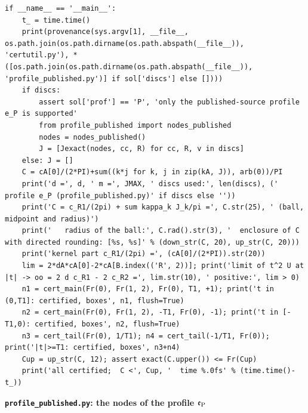 \documentclass[11pt,reqno]{amsart}
\numberwithin{equation}{section}
\theoremstyle{definition}
\theoremstyle{remark}
\newcommand{\appsub}[1]{\par\medskip\noindent\textbf{#1}\par\nobreak\smallskip}
\begin{document}
\begin{lstlisting}
if __name__ == '__main__':
    t_ = time.time()
    print(provenance(sys.argv[1], __file__, os.path.join(os.path.dirname(os.path.abspath(__file__)), 'certutil.py'), *([os.path.join(os.path.dirname(os.path.abspath(__file__)), 'profile_published.py')] if sol['discs'] else [])))
    if discs:
        assert sol['prof'] == 'P', 'only the published-source profile e_P is supported'
        from profile_published import nodes_published
        nodes = nodes_published()
        J = [Jexact(nodes, cc, R) for cc, R, v in discs]
    else: J = []
    C = cA[0]/(2*PI)+sum((k*j for k, j in zip(kA, J)), arb(0))/PI
    print('d =', d, ' m =', JMAX, ' discs used:', len(discs), (' profile e_P (profile_published.py)' if discs else ''))
    print('C = c_R1/(2pi) + sum kappa_k J_k/pi =', C.str(25), ' (ball, midpoint and radius)')
    print('   radius of the ball:', C.rad().str(3), '  enclosure of C with directed rounding: [%s, %s]' % (down_str(C, 20), up_str(C, 20)))
    print('kernel part c_R1/(2pi) =', (cA[0]/(2*PI)).str(20))
    lim = 2*dA*cA[0]-2*cA[B.index(('R', 2))]; print('limit of t^2 U at |t| -> oo = 2 d c_R1 - 2 c_R2 =', lim.str(10), ' positive:', lim > 0)
    n1 = cert_main(Fr(0), Fr(1, 2), Fr(0), T1, +1); print('t in (0,T1]: certified, boxes', n1, flush=True)
    n2 = cert_main(Fr(0), Fr(1, 2), -T1, Fr(0), -1); print('t in [-T1,0): certified, boxes', n2, flush=True)
    n3 = cert_tail(Fr(0), 1/T1); n4 = cert_tail(-1/T1, Fr(0)); print('|t|>=T1: certified, boxes', n3+n4)
    Cup = up_str(C, 12); assert exact(C.upper()) <= Fr(Cup)
    print('all certified;  C <', Cup, '  time %.0fs' % (time.time()-t_))
\end{lstlisting}
\appsub{\texttt{profile\_published.py}: the nodes of the profile $\mathfrak e_{\rm P}$}
\label{app:profile}
\end{document}
